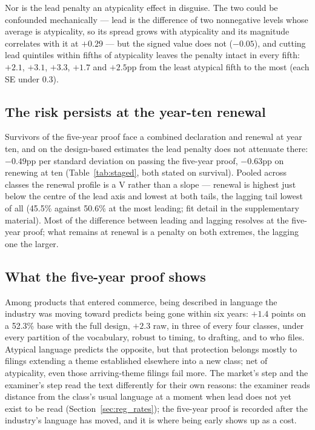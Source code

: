 Nor is the lead penalty an atypicality effect in disguise. The two could
be confounded mechanically --- lead is the difference of two nonnegative
levels whose average is atypicality, so its spread grows with atypicality
and its magnitude correlates with it at $+0.29$ --- but the signed value
does not ($-0.05$), and cutting lead quintiles within fifths of
atypicality leaves the penalty intact in every fifth: $+2.1$, $+3.1$,
$+3.3$, $+1.7$ and $+2.5$pp from the least atypical fifth to the most
(each SE under $0.3$).

\subsection{The risk persists at the year-ten renewal}\label{sec:renewal}

Survivors of the five-year proof face a combined declaration and renewal
at year ten, and on the design-based estimates the lead penalty does not
attenuate there: $-0.49$pp per standard deviation on passing the
five-year proof, $-0.63$pp on renewing at ten (Table~\ref{tab:staged},
both stated on survival). Pooled across classes the renewal profile is a
V rather than a slope --- renewal is highest just below the centre of the
lead axis and lowest at both tails, the lagging tail lowest of all
(45.5\% against 50.6\% at the most leading; fit detail in the
supplementary material). Most of the difference between leading and
lagging resolves at the five-year proof; what remains at renewal is a
penalty on both extremes, the lagging one the larger.

\subsection{What the five-year proof shows}\label{sec:gate_conclusion}

Among products that entered commerce, being described in language the
industry was moving toward predicts being gone within six years: $+1.4$
points on a 52.3\% base with the full design, $+2.3$ raw, in three of
every four classes, under every partition of the vocabulary, robust to
timing, to drafting, and to who files. Atypical language predicts the
opposite, but that protection belongs mostly to filings extending a theme
established elsewhere into a new class; net of atypicality, even those
arriving-theme filings fail more. The market's step and the examiner's
step read the text differently for their own reasons: the examiner reads
distance from the class's usual language at a moment when lead does not
yet exist to be read (Section~\ref{sec:reg_rates}); the five-year proof is
recorded after the industry's language has moved, and it is where being
early shows up as a cost.
